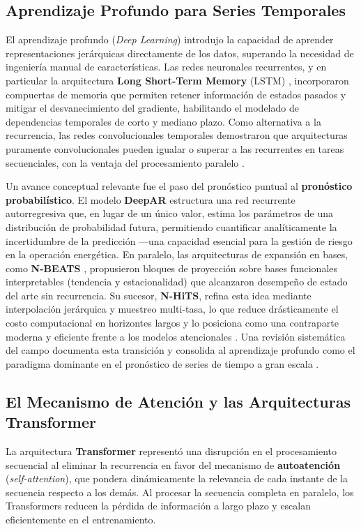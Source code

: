 \subsection{Aprendizaje Profundo para Series Temporales}
El aprendizaje profundo (\textit{Deep Learning}) introdujo la capacidad de aprender representaciones jerárquicas directamente de los datos, superando la necesidad de ingeniería manual de características. Las redes neuronales recurrentes, y en particular la arquitectura \textbf{Long Short-Term Memory} (LSTM) \cite{Hochreiter1997}, incorporaron compuertas de memoria que permiten retener información de estados pasados y mitigar el desvanecimiento del gradiente, habilitando el modelado de dependencias temporales de corto y mediano plazo. Como alternativa a la recurrencia, las redes convolucionales temporales demostraron que arquitecturas puramente convolucionales pueden igualar o superar a las recurrentes en tareas secuenciales, con la ventaja del procesamiento paralelo \cite{Bai2018}.

Un avance conceptual relevante fue el paso del pronóstico puntual al \textbf{pronóstico probabilístico}. El modelo \textbf{DeepAR} \cite{Salinas2020} estructura una red recurrente autorregresiva que, en lugar de un único valor, estima los parámetros de una distribución de probabilidad futura, permitiendo cuantificar analíticamente la incertidumbre de la predicción —una capacidad esencial para la gestión de riesgo en la operación energética. En paralelo, las arquitecturas de expansión en bases, como \textbf{N-BEATS} \cite{Oreshkin2020}, propusieron bloques de proyección sobre bases funcionales interpretables (tendencia y estacionalidad) que alcanzaron desempeño de estado del arte sin recurrencia. Su sucesor, \textbf{N-HiTS}, refina esta idea mediante interpolación jerárquica y muestreo multi-tasa, lo que reduce drásticamente el costo computacional en horizontes largos y lo posiciona como una contraparte moderna y eficiente frente a los modelos atencionales \cite{Challu2023}. Una revisión sistemática del campo documenta esta transición y consolida al aprendizaje profundo como el paradigma dominante en el pronóstico de series de tiempo a gran escala \cite{Benidis2022}.

\subsection{El Mecanismo de Atención y las Arquitecturas Transformer}
La arquitectura \textbf{Transformer} \cite{Vaswani2017} representó una disrupción en el procesamiento secuencial al eliminar la recurrencia en favor del mecanismo de \textbf{autoatención} (\textit{self-attention}), que pondera dinámicamente la relevancia de cada instante de la secuencia respecto a los demás. Al procesar la secuencia completa en paralelo, los Transformers reducen la pérdida de información a largo plazo y escalan eficientemente en el entrenamiento.

